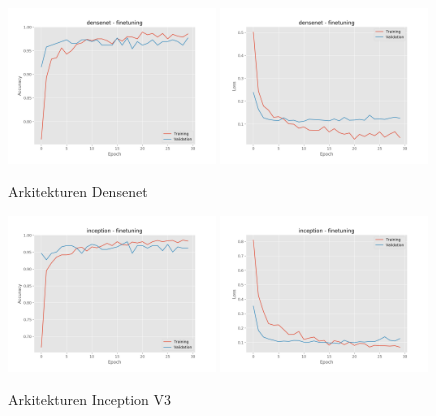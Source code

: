 \documentclass{kththesis}
\begin{document}
    \begin{figure}
      \centering
      \includegraphics[width=0.49\textwidth]{"./balcony/balcony-20split - acc - densenet - finetuning"}
      \includegraphics[width=0.49\textwidth]{"./balcony/balcony-20split - loss - densenet - finetuning"}
      \caption{Arkitekturen Densenet}
    \end{figure}

    \begin{figure}
      \centering
      \includegraphics[width=0.49\textwidth]{"./balcony/balcony-20split - acc - inception - finetuning"}
      \includegraphics[width=0.49\textwidth]{"./balcony/balcony-20split - loss - inception - finetuning"}
      \caption{Arkitekturen Inception V3}
    \end{figure}
\end{document}
